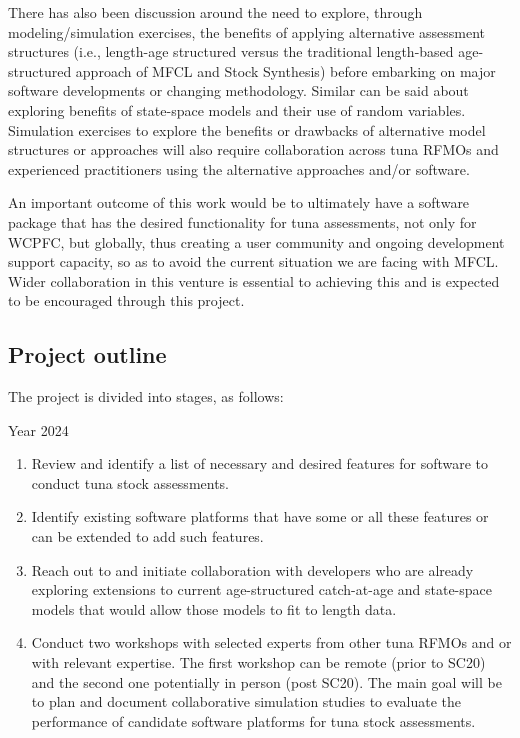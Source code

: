 \documentclass{SCreport}
\begin{document}
There has also been discussion around the need to explore, through
modeling/simulation exercises, the benefits of applying alternative assessment
structures (i.e., length-age structured versus the traditional length-based
age-structured approach of MFCL and Stock Synthesis) before embarking on major
software developments or changing methodology. Similar can be said about
exploring benefits of state-space models and their use of random variables.
Simulation exercises to explore the benefits or drawbacks of alternative model
structures or approaches will also require collaboration across tuna RFMOs and
experienced practitioners using the alternative approaches and/or software.

An important outcome of this work would be to ultimately have a software package
that has the desired functionality for tuna assessments, not only for WCPFC, but
globally, thus creating a user community and ongoing development support
capacity, so as to avoid the current situation we are facing with MFCL. Wider
collaboration in this venture is essential to achieving this and is expected to
be encouraged through this project.

\subsection{Project outline}

The project is divided into stages, as follows:

Year 2024

\begin{enumerate}
  \item Review and identify a list of necessary and desired features for
  software to conduct tuna stock assessments.
  \item Identify existing software platforms that have some or all these
  features or can be extended to add such features.
  \item Reach out to and initiate collaboration with developers who are already
  exploring extensions to current age-structured catch-at-age and state-space
  models that would allow those models to fit to length data.
  \item Conduct two workshops with selected experts from other tuna RFMOs and or
  with relevant expertise. The first workshop can be remote (prior to SC20) and
  the second one potentially in person (post SC20). The main goal will be to
  plan and document collaborative simulation studies to evaluate the performance
  of candidate software platforms for tuna stock assessments.
\end{enumerate}
\end{document}
